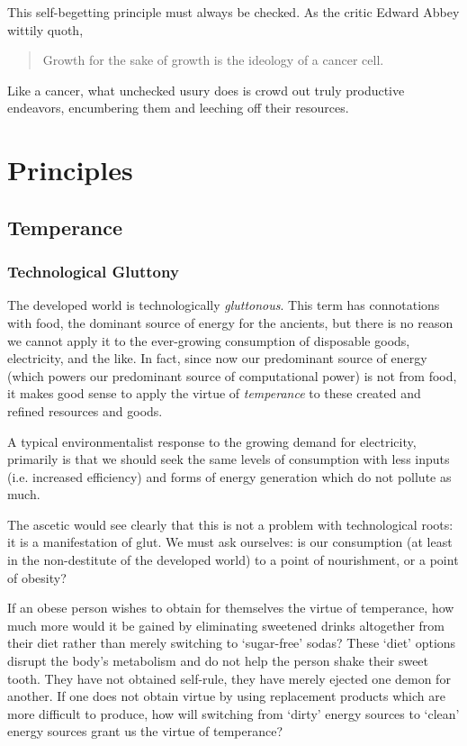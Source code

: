 \documentclass[letterpaper]{article}
\begin{document}
This self-begetting principle must always be checked. As the critic Edward Abbey wittily quoth,

\begin{quote}
  Growth for the sake of growth is the ideology of a cancer cell.
\end{quote}

Like a cancer, what unchecked usury does is crowd out truly productive endeavors, encumbering them and leeching off their resources.

\section{Principles}

\subsection{Temperance}

\subsubsection{Technological Gluttony}

The developed world is technologically \textit{gluttonous}. This term has connotations with food, the dominant source of energy for the ancients, but there is no reason we cannot apply it to the ever-growing consumption of disposable goods, electricity, and the like. In fact, since now our predominant source of energy (which powers our predominant source of computational power) is not from food, it makes good sense to apply the virtue of \textit{temperance} to these created and refined resources and goods.

A typical environmentalist response to the growing demand for electricity, primarily is that we should seek the same levels of consumption with less inputs (i.e. increased efficiency) and forms of energy generation which do not pollute as much.

The ascetic would see clearly that this is not a problem with technological roots: it is a manifestation of glut. We must ask ourselves: is our consumption (at least in the non-destitute of the developed world) to a point of nourishment, or a point of obesity?

If an obese person wishes to obtain for themselves the virtue of temperance, how much more would it be gained by eliminating sweetened drinks altogether from their diet rather than merely switching to `sugar-free' sodas? These `diet' options disrupt the body's metabolism and do not help the person shake their sweet tooth. They have not obtained self-rule, they have merely ejected one demon for another. If one does not obtain virtue by using replacement products which are more difficult to produce, how will switching from `dirty' energy sources to `clean' energy sources grant us the virtue of temperance?
\end{document}
